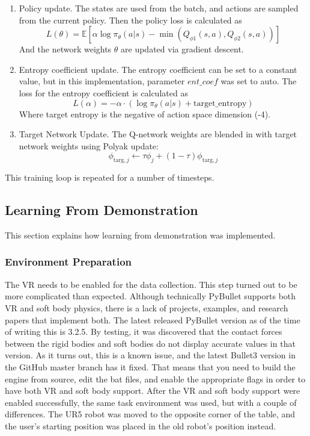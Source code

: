 \begin{enumerate}
\[  \]
  The Q network weights $\phi_i$ are updated by gradient descent with a learning rate of 0.0007 using the Adam optimizer.
  \item Policy update. The states are used from the batch, and actions are sampled from the current policy. Then the policy loss is calculated as
  \[
    L(\theta) = \mathbb{E} \left[ \alpha \log \pi_\theta(a | s) - \min(Q_{\phi1}(s, a), Q_{\phi2}(s, a)) \right]
  \]
  And the network weights $\theta$ are updated via gradient descent.
  \item Entropy coefficient update. The entropy coefficient can be set to a constant value, but in this implementation, parameter $ent\_coef$ was set to auto. The loss for the entropy coefficient is calculated as
  \[
    L(\alpha) = -\alpha \cdot \left( \log \pi_\theta(a | s) + \text{target\_entropy} \right)
  \]
  Where target entropy is the negative of action space dimension (-4).
  \item Target Network Update. The Q-network weights are blended in with target network weights using Polyak update:
  \[
    \phi_{\text{targ},j} \leftarrow \tau \phi_j + (1 - \tau) \phi_{\text{targ},j}
  \]
\end{enumerate}

This training loop is repeated for a number of timesteps.

\subsection{Learning From Demonstration}
This section explains how learning from demonstration was implemented.

\subsubsection{Environment Preparation}
The VR needs to be enabled for the data collection. This step turned out to be more complicated than expected. Although technically PyBullet supports both VR and soft body physics, there is a lack of projects, examples, and research papers that implement both. The latest released PyBullet version as of the time of writing this is 3.2.5. By testing, it was discovered that the contact forces between the rigid bodies and soft bodies do not display accurate values in that version. As it turns out, this is a known issue, and the latest Bullet3 version in the GitHub master branch has it fixed. That means that you need to build the engine from source, edit the bat files, and enable the appropriate flags in order to have both VR and soft body support. After the VR and soft body support were enabled successfully, the same task environment was used, but with a couple of differences. The UR5 robot was moved to the opposite corner of the table, and the user's starting position was placed in the old robot's position instead.

